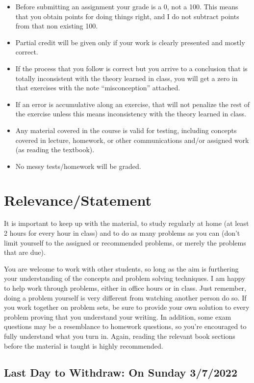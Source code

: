 \documentclass[12pt]{article}
\begin{document}
\begin{itemize}
\item Before submitting an assignment your grade is a 0, not a 100. This means that you obtain points for doing things right, and I do not subtract points from 
that non existing 100. 
\item Partial credit will be given only if your work is clearly presented and mostly correct.
\item If the process that you follow is correct but you arrive to a conclusion that is totally inconsistent with the theory learned in class, you will get a zero
 in that exercises with the note “misconception” attached. 
\item If an error is accumulative along an exercise, that will not penalize the rest of the exercise unless this means inconsistency with the theory learned in 
class. 
\item Any material covered in the course is valid for testing, including concepts covered in lecture, homework, or other communications and/or assigned work 
(as reading the textbook).
\item No messy tests/homework will be graded.
\end{itemize}

\section*{Relevance/Statement}

It is important to keep up with the material, to study regularly at home (at least 2 hours for every hour in class) and to do as many problems as you can 
(don’t limit yourself to the assigned or recommended problems, or merely the problems that are due).  

	You are welcome to work with other students, so long as the aim is furthering your understanding of the concepts and problem solving techniques. I am 
	happy to help work through problems, either in office hours or in class. Just remember, doing a problem yourself is very different from watching another 
	person do so. If you work together on problem sets, be sure to provide your own solution to every problem proving that you understand your writing. 
	In addition, some exam questions may be a resemblance to homework questions, so you’re encouraged to fully understand what you turn in. 
	Again, reading the relevant book sections before the material is taught is highly recommended. 


\subsection*{Last Day to Withdraw:    On Sunday 3/7/2022}
\end{document}
